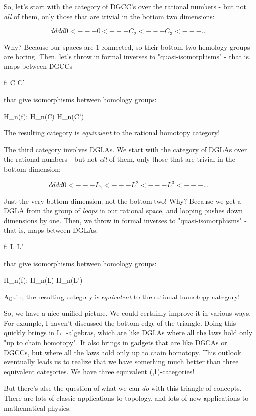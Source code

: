 So, let's start with the category of DGCC's over the rational
numbers - but not \emph{all} of them, only those that are trivial in
the bottom two dimensions:


$$

    d      d       d       d
0 <--- 0 <--- C_{2} <--- C_{3} <--- ...
$$
    

Why?  Because our spaces are 1-connected, so their bottom two
homology groups are boring.  Then, let's throw in formal inverses to
"quasi-isomorphisms" - that is, maps between DGCCs

f: C \to  C'

that give isomorphisms between homology groups:

H_{n}(f): H_{n}(C) \to  H_{n}(C')

The resulting category is \emph{equivalent} to the rational 
homotopy category!

The third category involves DGLAs.  We start with the category of
DGLAs over the rational numbers - but not \emph{all} of them, only
those that are trivial in the bottom dimension:


$$

    d       d       d      d
0 <--- L_{1} <--- L^{2} <--- L^{3} <--- ...
$$
    

Just the very bottom dimension, not the bottom two!  Why?  Because we
get a DGLA from the group of \emph{loops} in our rational space, and
looping pushes down dimensions by one.  Then, we throw in formal
inverses to "quasi-isomorphisms" - that is, maps between
DGLAs:

f: L \to  L'

that give isomorphisms between homology groups:

H_{n}(f): H_{n}(L) \to  H_{n}(L')

Again, the resulting category is \emph{equivalent} to the rational 
homotopy category!

So, we have a nice unified picture.  We could certainly improve it in
various ways.  For example, I haven't discussed the bottom edge of the
triangle.  Doing this quickly brings in L_{\infty }-algebras,
which are like DGLAs where all the laws hold only "up to chain
homotopy".  It also brings in gadgets that are like DGCAs or
DGCCs, but where all the laws hold only up to chain homotopy.  This
outlook eventually leads us to realize that we have something much
better than three equivalent categories.  We have three equivalent
(\infty ,1)-categories!

But there's also the question of what we can \emph{do} with this
triangle of concepts.  There are lots of classic applications
to topology, and lots of new applications to mathematical
physics.  

